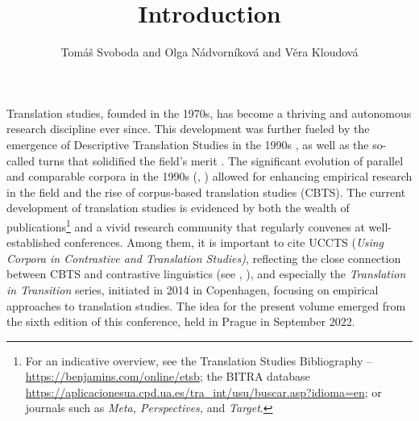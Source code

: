 \documentclass[output=paper]{langscibook}
\author{Tomáš Svoboda\affiliation{Charles University} and Olga Nádvorníková\affiliation{Charles University} and Věra Kloudová\affiliation{Charles University}}
\title{Introduction}
\begin{document}
\maketitle 


Translation studies, founded in the 1970s, has become a thriving and autonomous research discipline ever since. This development was further fueled by the emergence of Descriptive Translation Studies in the 1990s \citep{Toury1995}, as well as the so-called turns that solidified the field’s merit \citep{Snell-hornby2006}. The significant evolution of parallel and comparable corpora in the 1990s (\citealt{Baker1993}, \citealt{Johansson1998}) allowed for enhancing empirical research in the field and the rise of corpus-based translation studies (CBTS). The current development of translation studies is evidenced by both the wealth of publications\footnote{{For an indicative overview, see the Translation Studies Bibliography –} \url{https://benjamins.com/online/etsb}{; the BITRA database} \url{https://aplicacionesua.cpd.ua.es/tra_int/usu/buscar.asp?idioma=en}{; or journals such as} {\textit{Meta, Perspectives,} }{and} {\textit{Target}}.} and a vivid research community that regularly convenes at well-established conferences. Among them, it is important to cite UCCTS{ (\textit{Using Corpora in Contrastive and Translation Studies)}, reflecting the close connection between CBTS and contrastive linguistics (see \citealt{BernardiniFerraresi2023}, \citealt{CzuloHansen-Schirra2017}), and especially the \textit{Translation in Transition} series, initiated in 2014 in Copenhagen, focusing on empirical approaches to translation studies. The idea for the present volume emerged from the sixth edition of this conference, held in Prague in  {September 2022}.}
\end{document}
